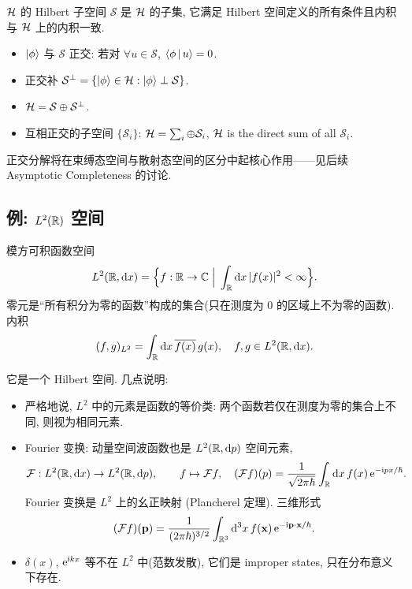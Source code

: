\begin{definition}
$\mathcal{H}$ 的 Hilbert 子空间 $\mathcal S$ 是 $\mathcal{H}$ 的子集, 它满足 Hilbert 空间定义的所有条件且内积与 $\mathcal{H}$ 上的内积一致.
\end{definition}

\begin{itemize}
    \item $\ket\phi$ 与 $\mathcal S$ 正交: 若对 $\forall u\in\mathcal S$, $\left\langle \phi \,\middle|\, u \right\rangle=0$.
    \item 正交补 $\mathcal S^{\perp}=\{\ket\phi\in\mathcal{H}:\ket\phi\perp \mathcal S\}$.
    \item $\mathcal{H}=\mathcal S\oplus \mathcal S^{\perp}$.
    \item 互相正交的子空间 $\{\mathcal S_i\}$: $\mathcal{H}=\sum_i\oplus \mathcal S_i$, $\mathcal{H}$ is the direct sum of all $\mathcal S_i$.
\end{itemize}

正交分解将在束缚态空间与散射态空间的区分中起核心作用——见后续 Asymptotic Completeness 的讨论.

\subsection{例: \texorpdfstring{$L^{2}(\mathbb{R})$}{L²(R)} 空间}\label{subsec:L2-example}

\begin{definition}[$L^{2}$ 空间]
模方可积函数空间
\begin{equation}
L^{2}(\mathbb{R},\mathrm{d} x)=\Big\{f:\mathbb{R}\to\mathbb{C}\;\Big|\;\int_{\mathbb{R}}\mathrm{d} x\,|f(x)|^{2}<\infty\Big\}.
\end{equation}
零元是``所有积分为零的函数''构成的集合(只在测度为 $0$ 的区域上不为零的函数). 内积
\begin{equation}
(f,g)_{L^{2}}=\int_{\mathbb{R}}\mathrm{d} x\,\overline{f(x)}\,g(x),\quad f,g\in L^{2}(\mathbb{R},\mathrm{d} x).
\end{equation}
\end{definition}

它是一个 Hilbert 空间. 几点说明:
\begin{itemize}
    \item 严格地说, $L^{2}$ 中的元素是函数的等价类: 两个函数若仅在测度为零的集合上不同, 则视为相同元素.
    \item Fourier 变换: 动量空间波函数也是 $L^{2}(\mathbb{R},\mathrm{d} p)$ 空间元素,
    \begin{equation}
    \mathcal F:L^{2}(\mathbb{R},\mathrm{d} x)\to L^{2}(\mathbb{R},\mathrm{d} p),\qquad
    f\mapsto \mathcal F f,\quad (\mathcal F f)(p)=\frac{1}{\sqrt{2\pi\hbar}}\int_{\mathbb{R}}\mathrm{d} x\,f(x)\,\mathrm{e}^{-\mathrm{i} p x/\hbar}.
    \label{eq:fourier-1d}
    \end{equation}
    Fourier 变换是 $L^{2}$ 上的幺正映射 (Plancherel 定理). 三维形式
    \begin{equation}
    (\mathcal F f)(\mathbf p)=\frac{1}{(2\pi\hbar)^{3/2}}\int_{\mathbb{R}^{3}}\mathrm{d}^{3}x\,f(\mathbf x)\,\mathrm{e}^{-\mathrm{i}\mathbf p\cdot\mathbf x/\hbar}.
    \end{equation}
    \item $\delta(x)$, $\mathrm{e}^{\mathrm{i} k x}$ 等不在 $L^{2}$ 中(范数发散), 它们是 improper states, 只在分布意义下存在.
\end{itemize}

